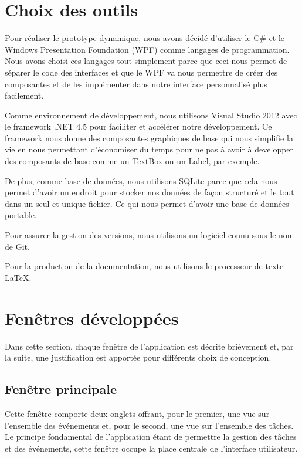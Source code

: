 \documentclass[letterpaper, oneside, 12pt, these, creativecommons]{thETS}
\begin{document}
\section{Choix des outils}

Pour réaliser le prototype dynamique, nous avons décidé d'utiliser le C\# et le Windows Presentation Foundation (WPF) comme langages de programmation. Nous avons choisi ces langages tout simplement parce que ceci nous permet de séparer le code des interfaces et que le WPF va nous permettre de créer des composantes et de les implémenter dans notre interface personnalisé plus facilement. 

Comme environnement de développement, nous utilisons Visual Studio 2012 avec le framework .NET 4.5 pour faciliter et accélérer notre développement. Ce framework nous donne des composantes graphiques de base qui nous simplifie la vie en nous permettant d'économiser du temps pour ne pas à avoir à developper des composants de base comme un TextBox ou un Label, par exemple.

De plus, comme base de données, nous utilisons SQLite parce que cela nous permet d'avoir un endroit pour stocker nos données de façon structuré et le tout dans un seul et unique fichier. Ce qui nous permet d'avoir une base de données portable.

Pour assurer la gestion des versions, nous utilisons un logiciel connu sous le nom de Git.

Pour la production de la documentation, nous utilisons le processeur de texte \LaTeX.

\newpage

\section{Fenêtres développées}

Dans cette section, chaque fenêtre de l'application est décrite brièvement et, par la suite, une justification est apportée pour différents choix de conception.

\subsection{Fenêtre principale}

Cette fenêtre comporte deux onglets offrant, pour le premier, une vue sur l'ensemble des événements et, pour le second, une vue sur l'ensemble des tâches. Le principe fondamental de l'application étant de permettre la gestion des tâches et des événements, cette fenêtre occupe la place centrale de l'interface utilisateur.
\end{document}
